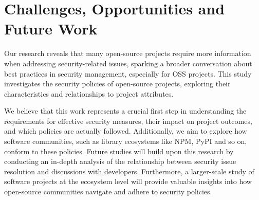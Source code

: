 \section{Challenges, Opportunities and Future Work}

Our research reveals that many open-source projects require more information when addressing security-related issues, sparking a broader conversation about best practices in security management, especially for OSS projects.
This study investigates the security policies of open-source projects, exploring their characteristics and relationships to project attributes. 

We believe that this work represents a crucial first step in understanding the requirements for effective security measures, their impact on project outcomes, and which policies are actually followed. Additionally, we aim to explore how software communities, such as library ecosystems like NPM, PyPI and so on, conform to these policies.
Future studies will build upon this research by conducting an in-depth analysis of the relationship between security issue resolution and discussions with developers. Furthermore, a larger-scale study of software projects at the ecosystem level will provide valuable insights into how open-source communities navigate and adhere to security policies.







